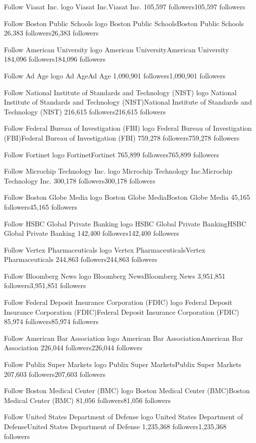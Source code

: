 Follow
Viasat Inc. logo
Viasat Inc.Viasat Inc.
105,597 followers105,597 followers

Follow
Boston Public Schools logo
Boston Public SchoolsBoston Public Schools
26,383 followers26,383 followers

Follow
American University logo
American UniversityAmerican University
184,096 followers184,096 followers

Follow
Ad Age logo
Ad AgeAd Age
1,090,901 followers1,090,901 followers

Follow
National Institute of Standards and Technology (NIST) logo
National Institute of Standards and Technology (NIST)National Institute of Standards and Technology (NIST)
216,615 followers216,615 followers

Follow
Federal Bureau of Investigation (FBI) logo
Federal Bureau of Investigation (FBI)Federal Bureau of Investigation (FBI)
759,278 followers759,278 followers

Follow
Fortinet logo
FortinetFortinet
765,899 followers765,899 followers

Follow
Microchip Technology Inc. logo
Microchip Technology Inc.Microchip Technology Inc.
300,178 followers300,178 followers

Follow
Boston Globe Media logo
Boston Globe MediaBoston Globe Media
45,165 followers45,165 followers

Follow
HSBC Global Private Banking logo
HSBC Global Private BankingHSBC Global Private Banking
142,400 followers142,400 followers

Follow
Vertex Pharmaceuticals logo
Vertex PharmaceuticalsVertex Pharmaceuticals
244,863 followers244,863 followers

Follow
Bloomberg News logo
Bloomberg NewsBloomberg News
3,951,851 followers3,951,851 followers

Follow
Federal Deposit Insurance Corporation (FDIC) logo
Federal Deposit Insurance Corporation (FDIC)Federal Deposit Insurance Corporation (FDIC)
85,974 followers85,974 followers

Follow
American Bar Association logo
American Bar AssociationAmerican Bar Association
226,044 followers226,044 followers

Follow
Publix Super Markets logo
Publix Super MarketsPublix Super Markets
207,603 followers207,603 followers

Follow
Boston Medical Center (BMC) logo
Boston Medical Center (BMC)Boston Medical Center (BMC)
81,056 followers81,056 followers

Follow
United States Department of Defense logo
United States Department of DefenseUnited States Department of Defense
1,235,368 followers1,235,368 followers

